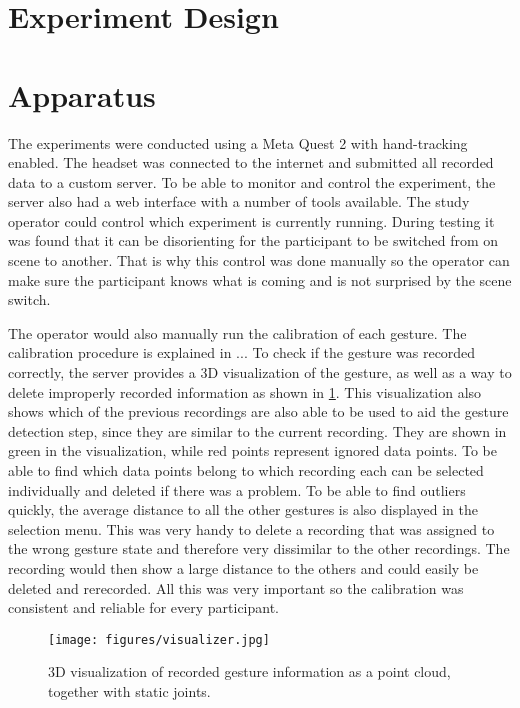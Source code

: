 \section{Experiment Design}

\section{Apparatus}

The experiments were conducted using a Meta Quest 2 with hand-tracking enabled. The headset was connected to the internet and submitted all recorded data to a custom server. To be able to monitor and control the experiment, the server also had a web interface with a number of tools available. The study operator could control which experiment is currently running. During testing it was found that it can be disorienting for the participant to be switched from on scene to another. That is why this control was done manually so the operator can make sure the participant knows what is coming and is not surprised by the scene switch.

The operator would also manually run the calibration of each gesture. The calibration procedure is explained in ... %
To check if the gesture was recorded correctly, the server provides a 3D visualization of the gesture, as well as a way to delete improperly recorded information as shown in \ref{fig:vis}. This visualization also shows which of the previous recordings are also able to be used to aid the gesture detection step, since they are similar to the current recording. They are shown in green in the visualization, while red points represent ignored data points. To be able to find which data points belong to which recording each can be selected individually and deleted if there was a problem. To be able to find outliers quickly, the average distance to all the other gestures is also displayed in the selection menu. This was very handy to delete a recording that was assigned to the wrong gesture state and therefore very dissimilar to the other recordings. The recording would then show a large distance to the others and could easily be deleted and rerecorded. All this was very important so the calibration was consistent and reliable for every participant.

\begin{figure}[!ht]
    \centering
    \texttt{[image: figures/visualizer.jpg]}
    \caption{3D visualization of recorded gesture information as a point cloud, together with static joints.}
    \label{fig:vis}
\end{figure}

